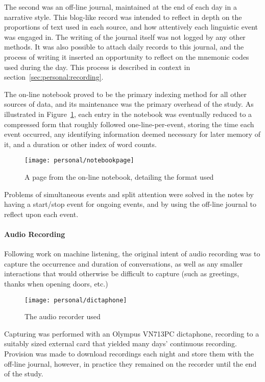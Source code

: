 The second was an off-line journal, maintained at the end of each day in a narrative style.  This blog-like record was intended to reflect in depth on the proportions of text used in each source, and how attentively each linguistic event was engaged in.  The writing of the journal itself was not logged by any other methods.  It was also possible to attach daily records to this journal, and the process of writing it inserted an opportunity to reflect on the mnemonic codes used during the day.  This process is described in context in section~\ref{sec:personal:recording}.

The on-line notebook proved to be the primary indexing method for all other sources of data, and its maintenance was the primary overhead of the study.  As illustrated in Figure~\ref{fig:personal:notebookformat}, each entry in the notebook was eventually reduced to a compressed form that roughly followed one-line-per-event, storing the time each event occurred, any identifying information deemed necessary for later memory of it, and a duration or other index of word counts.

\begin{figure}[p]
    \centering
    \texttt{[image: personal/notebookpage]}
    \caption{A page from the on-line notebook, detailing the format used}
    \label{fig:personal:notebookformat}
\end{figure}


Problems of simultaneous events and split attention were solved in the notes by having a start/stop event for ongoing events, and by using the off-line journal to reflect upon each event.

\paragraph{Audio Recording}
Following work on machine listening, the original intent of audio recording was to capture the occurrence and duration of conversations, as well as any smaller interactions that would otherwise be difficult to capture (such as greetings, thanks when opening doors, etc.)


\begin{figure}[p]
    \centering
    \texttt{[image: personal/dictaphone]}
    \caption{The audio recorder used}
    \label{fig:personal:audiorecorder}
\end{figure}



Capturing was performed with an Olympus VN713PC dictaphone, recording to a suitably sized external card that yielded many days' continuous recording.  Provision was made to download recordings each night and store them with the off-line journal, however, in practice they remained on the recorder until the end of the study.


